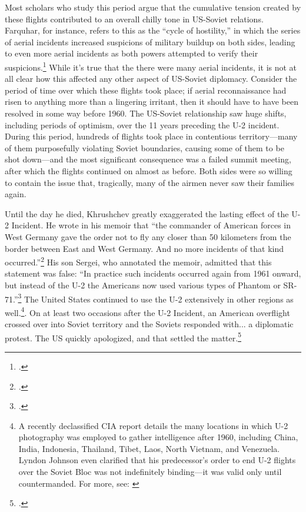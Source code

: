 \documentclass[14pt]{extarticle}
\begin{document}
Most scholars who study this period argue that the cumulative tension created by these flights contributed to an overall chilly tone in US-Soviet relations. Farquhar, for instance, refers to this as the \enquote{cycle of hostility,} in which the series of aerial incidents increased suspicions of military buildup on both sides, leading to even more aerial incidents as both powers attempted to verify their suspicions.\footcite[p.~43]{farquhar_aerial_2015} While it's true that the there were many aerial incidents, it is not at all clear how this affected any other aspect of US-Soviet diplomacy. Consider the period of time over which these flights took place; if aerial reconnaissance had risen to anything more than a lingering irritant, then it should have to have been resolved in some way before 1960. The US-Soviet relationship saw huge shifts, including periods of optimism, over the 11 years preceding the U-2 incident. During this period, hundreds of flights took place in contentious territory---many of them purposefully violating Soviet boundaries, causing some of them to be shot down---and the most significant consequence was a failed summit meeting, after which the flights continued on almost as before. Both sides were so willing to contain the issue that, tragically, many of the airmen never saw their families again.

Until the day he died, Khrushchev greatly exaggerated the lasting effect of the U-2 Incident. He wrote in his memoir that \enquote{the commander of American forces in West Germany gave the order not to fly any closer than 50 kilometers from the border between East and West Germany. And no more incidents of that kind occurred.}\footcite[p.~256]{khrushchev_memoirs_2007} His son Sergei, who annotated the memoir, admitted that this statement was false: \enquote{In practice such incidents occurred again from 1961 onward, but instead of the U-2 the Americans now used various types of Phantom or SR-71.}\footcite[p.~258]{khrushchev_memoirs_2007} The United States continued to use the U-2 extensively in other regions as well.\footnote{A recently declassified CIA report details the many locations in which U-2 photography was employed to gather intelligence after 1960, including China, India, Indonesia, Thailand, Tibet, Laos, North Vietnam, and Venezuela. Lyndon Johnson even clarified that his predecessor's order to end U-2 flights over the Soviet Bloc was not indefinitely binding---it was valid only until countermanded. For more, see: \cite[p.~195]{pedlow_central_1992}}. On at least two occasions after the U-2 Incident, an American overflight crossed over into Soviet territory and the Soviets responded with... a diplomatic protest. The US quickly apologized, and that settled the matter.\footcite{orlov_u-2_2007}
\end{document}
